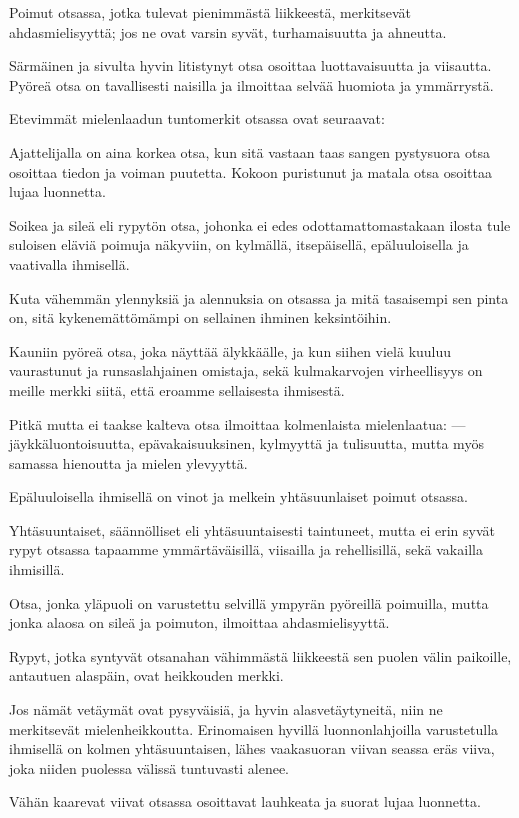 \documentclass[11pt, twoside, finnish, a5paper]{book}
\begin{document}
Poimut otsassa, jotka tulevat pienimmästä liikkeestä,
merkitsevät ahdasmielisyyttä; jos ne ovat varsin syvät,
turhamaisuutta ja ahneutta.

Särmäinen ja sivulta hyvin litistynyt otsa osoittaa
luottavaisuutta ja viisautta. Pyöreä otsa on tavallisesti
naisilla ja ilmoittaa selvää huomiota ja ymmärrystä.

Etevimmät mielenlaadun tuntomerkit otsassa ovat seuraavat:

Ajattelijalla on aina korkea otsa, kun sitä vastaan taas
sangen pystysuora otsa osoittaa tiedon ja voiman puutetta.
Kokoon puristunut ja matala otsa osoittaa lujaa luonnetta.

Soikea ja sileä eli rypytön otsa, johonka ei edes
odottamattomastakaan ilosta tule suloisen eläviä poimuja
näkyviin, on kylmällä, itsepäisellä, epäluuloisella ja 
vaativalla ihmisellä.

Kuta vähemmän ylennyksiä ja alennuksia on otsassa
ja mitä tasaisempi sen pinta on, sitä kykenemättömämpi
on sellainen ihminen keksintöihin.

Kauniin pyöreä otsa, joka näyttää älykkäälle, ja kun
siihen vielä kuuluu vaurastunut ja runsaslahjainen
omistaja, sekä kulmakarvojen virheellisyys on meille merkki
siitä, että eroamme sellaisesta ihmisestä.

Pitkä mutta ei taakse kalteva otsa ilmoittaa kolmenlaista
mielenlaatua: — jäykkäluontoisuutta, epävakaisuuksinen,
kylmyyttä ja tulisuutta, mutta myös samassa hienoutta
ja mielen ylevyyttä.
 
Epäluuloisella ihmisellä on vinot ja melkein yhtäsuunlaiset poimut otsassa.

Yhtäsuuntaiset, säännölliset eli yhtäsuuntaisesti taintuneet,
mutta ei erin syvät rypyt otsassa tapaamme ymmärtäväisillä,
viisailla ja rehellisillä, sekä vakailla ihmisillä.

Otsa, jonka yläpuoli on varustettu selvillä ympyrän
pyöreillä poimuilla, mutta jonka alaosa on sileä ja poimuton,
ilmoittaa ahdasmielisyyttä.

Rypyt, jotka syntyvät otsanahan vähimmästä liikkeestä
sen puolen välin paikoille, antautuen alaspäin, ovat
heikkouden merkki.

Jos nämät vetäymät ovat pysyväisiä, ja hyvin alasvetäytyneitä,
niin ne merkitsevät mielenheikkoutta. Erinomaisen hyvillä
luonnonlahjoilla varustetulla ihmisellä on
kolmen yhtäsuuntaisen, lähes vaakasuoran viivan seassa
eräs viiva, joka niiden puolessa välissä tuntuvasti alenee.

Vähän kaarevat viivat otsassa osoittavat lauhkeata ja
suorat lujaa luonnetta.
\end{document}
